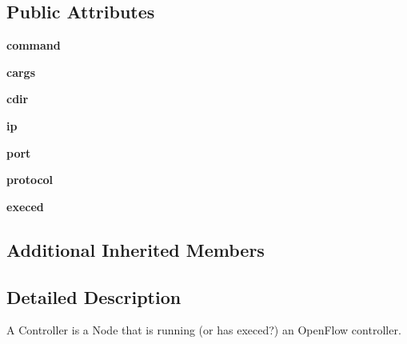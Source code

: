 \subsection*{Public Attributes}
\begin{DoxyCompactItemize}
\item 
\hypertarget{classmininet_1_1node_1_1Controller_ab3b1decf4ea17602e6f64ccce7f5b7ff}{{\bfseries command}}\label{classmininet_1_1node_1_1Controller_ab3b1decf4ea17602e6f64ccce7f5b7ff}

\item 
\hypertarget{classmininet_1_1node_1_1Controller_a5bca25bc759af1a6275870f31d05022a}{{\bfseries cargs}}\label{classmininet_1_1node_1_1Controller_a5bca25bc759af1a6275870f31d05022a}

\item 
\hypertarget{classmininet_1_1node_1_1Controller_a471632985033e1b52232e1550ff8b57e}{{\bfseries cdir}}\label{classmininet_1_1node_1_1Controller_a471632985033e1b52232e1550ff8b57e}

\item 
\hypertarget{classmininet_1_1node_1_1Controller_a8fc2e5696523f9f821fb01904392cdb3}{{\bfseries ip}}\label{classmininet_1_1node_1_1Controller_a8fc2e5696523f9f821fb01904392cdb3}

\item 
\hypertarget{classmininet_1_1node_1_1Controller_acb15ce19a07f469ba457b09f5cdee7f7}{{\bfseries port}}\label{classmininet_1_1node_1_1Controller_acb15ce19a07f469ba457b09f5cdee7f7}

\item 
\hypertarget{classmininet_1_1node_1_1Controller_a2c5d2f00f45148638b1c2f9646bd6d33}{{\bfseries protocol}}\label{classmininet_1_1node_1_1Controller_a2c5d2f00f45148638b1c2f9646bd6d33}

\item 
\hypertarget{classmininet_1_1node_1_1Controller_afca6829cdf74d74ecc9de9a21330efed}{{\bfseries execed}}\label{classmininet_1_1node_1_1Controller_afca6829cdf74d74ecc9de9a21330efed}

\end{DoxyCompactItemize}
\subsection*{Additional Inherited Members}


\subsection{Detailed Description}
\begin{DoxyVerb}A Controller is a Node that is running (or has execed?) an
   OpenFlow controller.\end{DoxyVerb}
 


